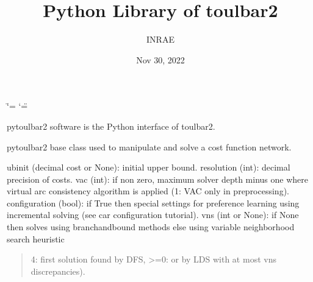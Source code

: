 \documentclass[letterpaper,10pt,openany,oneside,english]{sphinxmanual}
\title{Python Library of toulbar2}
\date{Nov 30, 2022}
\author{INRAE}
\begin{document}
\ifdefined\shorthandoff
  \ifnum\catcode`\=\string=\active\shorthandoff{=}\fi
  \ifnum\catcode`\"=\active{}\fi
\fi

\pagestyle{empty}
\sphinxmaketitle
\pagestyle{plain}
\sphinxtableofcontents
\pagestyle{normal}
\label{\detokenize{ref/ref_python::doc}}


\sphinxAtStartPar
pytoulbar2 software is the Python interface of toulbar2.

\begin{fulllineitems}
\label{\detokenize{ref/ref_python:pytoulbar2.CFN}}
\pysigstartsignatures
{}
\pysigstopsignatures
\sphinxAtStartPar
pytoulbar2 base class used to manipulate and solve a cost function network.
\begin{description}
\sphinxAtStartPar
ubinit (decimal cost or None): initial upper bound.
resolution (int): decimal precision of costs.
vac (int): if non zero, maximum solver depth minus one where virtual arc consistency algorithm is applied (1: VAC only in preprocessing).
configuration (bool): if True then special settings for preference learning using incremental solving (see car configuration tutorial).
vns (int or None): if None then solves using branch\sphinxhyphen{}and\sphinxhyphen{}bound methods else using variable neighborhood search heuristic
\begin{quote}
\begin{description}
\sphinxAtStartPar
\sphinxhyphen{}4: first solution found by DFS, \textgreater{}=0: or by LDS with at most vns discrepancies).

\end{description}
\end{quote}


\end{description}
\end{fulllineitems}
\end{document}
